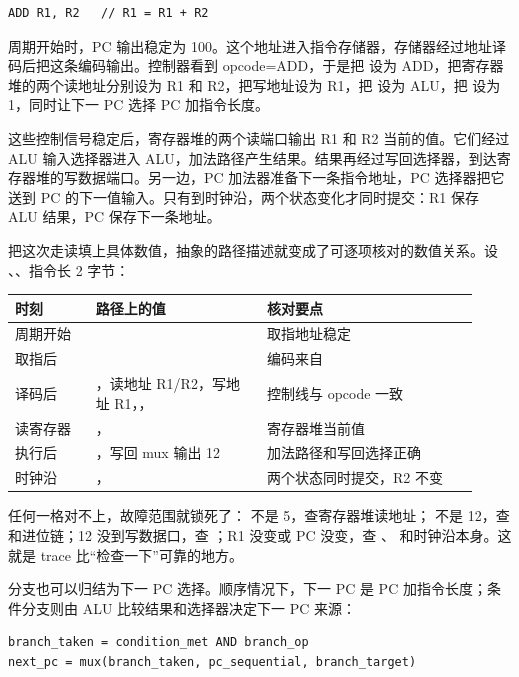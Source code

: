 \begin{lstlisting}
ADD R1, R2   // R1 = R1 + R2
\end{lstlisting}

周期开始时，PC 输出稳定为 100。这个地址进入指令存储器，存储器经过地址译码后把这条编码输出。控制器看到 opcode=ADD，于是把  设为 ADD，把寄存器堆的两个读地址分别设为 R1 和 R2，把写地址设为 R1，把  设为 ALU，把  设为 1，同时让下一 PC 选择 PC 加指令长度。

这些控制信号稳定后，寄存器堆的两个读端口输出 R1 和 R2 当前的值。它们经过 ALU 输入选择器进入 ALU，加法路径产生结果。结果再经过写回选择器，到达寄存器堆的写数据端口。另一边，PC 加法器准备下一条指令地址，PC 选择器把它送到 PC 的下一值输入。只有到时钟沿，两个状态变化才同时提交：R1 保存 ALU 结果，PC 保存下一条地址。

把这次走读填上具体数值，抽象的路径描述就变成了可逐项核对的数值关系。设 、、指令长 2 字节：

\begin{longtable}{L{0.16\linewidth}L{0.34\linewidth}L{0.42\linewidth}}
\toprule
时刻 & 路径上的值 & 核对要点 \\
\midrule
周期开始 &  & 取指地址稳定 \\
取指后 &  & 编码来自  \\
译码后 & ，读地址 R1/R2，写地址 R1，， & 控制线与 opcode 一致 \\
读寄存器 & ， & 寄存器堆当前值 \\
执行后 & ，写回 mux 输出 12 & 加法路径和写回选择正确 \\
时钟沿 & ， & 两个状态同时提交，R2 不变 \\
\bottomrule
\end{longtable}

任何一格对不上，故障范围就锁死了： 不是 5，查寄存器堆读地址； 不是 12，查  和进位链；12 没到写数据口，查 ；R1 没变或 PC 没变，查 、 和时钟沿本身。这就是 trace 比“检查一下”可靠的地方。

分支也可以归结为下一 PC 选择。顺序情况下，下一 PC 是 PC 加指令长度；条件分支则由 ALU 比较结果和选择器决定下一 PC 来源：

\begin{lstlisting}
branch_taken = condition_met AND branch_op
next_pc = mux(branch_taken, pc_sequential, branch_target)
\end{lstlisting}

